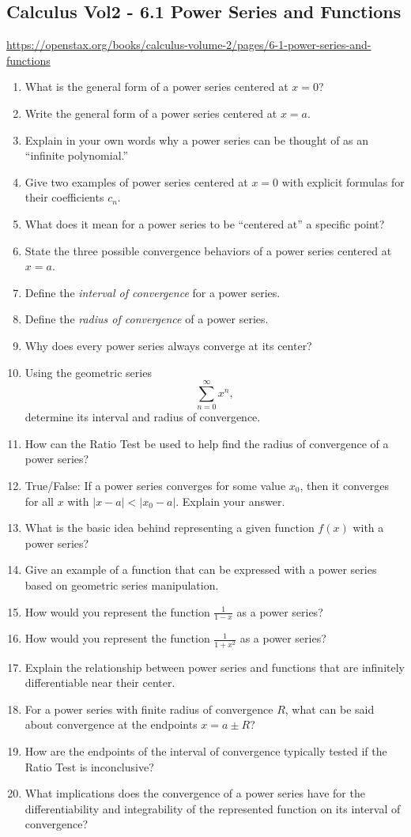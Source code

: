 \subsection{Calculus Vol2 - 6.1 Power Series and Functions}

\url{https://openstax.org/books/calculus-volume-2/pages/6-1-power-series-and-functions}

\begin{enumerate}
  \item What is the general form of a power series centered at \(x=0\)?
  \item Write the general form of a power series centered at \(x=a\).
  \item Explain in your own words why a power series can be thought of as an “infinite polynomial.”
  \item Give two examples of power series centered at \(x=0\) with explicit formulas for their coefficients \(c_{n}\).
  \item What does it mean for a power series to be “centered at” a specific point?
  \item State the three possible convergence behaviors of a power series centered at \(x=a\).
  \item Define the \emph{interval of convergence} for a power series.
  \item Define the \emph{radius of convergence} of a power series.
  \item Why does every power series always converge at its center?
  \item Using the geometric series
    \[ \sum_{n=0}^{\infty} x^{n}, \]
    determine its interval and radius of convergence.
  \item How can the Ratio Test be used to help find the radius of convergence of a power series?
  \item True/False: If a power series converges for some value \(x_{0}\), then it converges for all \(x\) with \(|x-a|<|x_{0}-a|\). Explain your answer.
  \item What is the basic idea behind representing a given function \(f(x)\) with a power series?
  \item Give an example of a function that can be expressed with a power series based on geometric series manipulation.
  \item How would you represent the function \(\frac{1}{1-x}\) as a power series?
  \item How would you represent the function \(\frac{1}{1+x^{2}}\) as a power series?
  \item Explain the relationship between power series and functions that are infinitely differentiable near their center.
  \item For a power series with finite radius of convergence \(R\), what can be said about convergence at the endpoints \(x=a\pm R\)?
  \item How are the endpoints of the interval of convergence typically tested if the Ratio Test is inconclusive?
  \item What implications does the convergence of a power series have for the differentiability and integrability of the represented function on its interval of convergence?
\end{enumerate}
